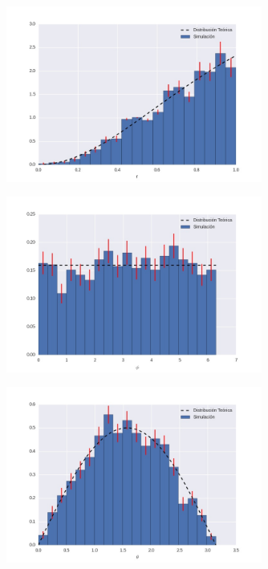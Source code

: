 \documentclass{article}
\begin{document}
\begin{figure}
\centering
\includegraphics[width=0.75\textwidth]{g4ej10_r.jpg}
\caption[]{}
\label{fig:g4ej10_r}
\end{figure}

\begin{figure}
\centering
\includegraphics[width=0.75\textwidth]{g4ej10_phi.jpg}
\caption[]{}
\label{fig:g4ej10_r}
\end{figure}

\begin{figure}
\centering
\includegraphics[width=0.75\textwidth]{g4ej10_theta.jpg}
\caption[]{}
\label{fig:g4ej10_r}
\end{figure}
\end{document}
